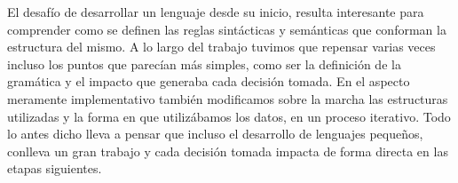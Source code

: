 El desafío de desarrollar un lenguaje desde su inicio, resulta interesante para comprender como se definen las reglas sintácticas y semánticas que conforman la estructura del mismo.
A lo largo del trabajo tuvimos que repensar varias veces incluso los puntos que parecían más simples, como ser la definición de la gramática y el impacto que generaba cada decisión tomada.
En el aspecto meramente implementativo también modificamos sobre la marcha las estructuras utilizadas y la forma en que utilizábamos los datos, en un proceso iterativo.
Todo lo antes dicho lleva a pensar que incluso el desarrollo de lenguajes pequeños, conlleva un gran trabajo y cada decisión tomada impacta de forma directa en las etapas siguientes.
